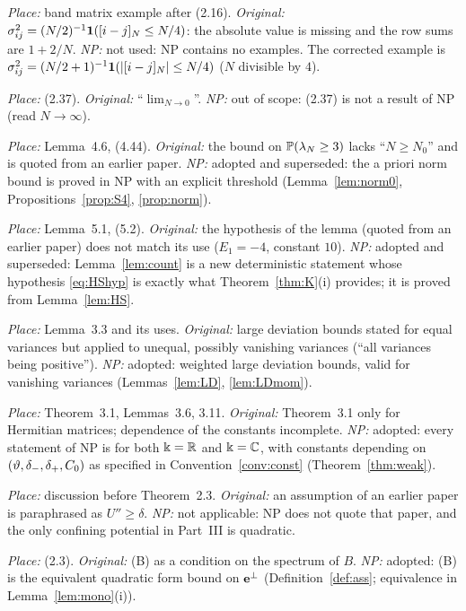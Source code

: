 \begin{description}[leftmargin=1.5em,itemsep=3pt,font=\normalfont\bfseries]
\item[PD-07] \emph{Place:} band matrix example after (2.16). \emph{Original:} $\sigma_{ij}^2=(N/2)^{-1}\mathbf{1}([i-j]_N\le N/4)$: the absolute value is missing and the row sums are $1+2/N$. \emph{NP:} not used: NP contains no examples. The corrected example is $\sigma_{ij}^2=(N/2+1)^{-1}\mathbf{1}(|[i-j]_N|\le N/4)$ ($N$ divisible by $4$).
\item[PD-08] \emph{Place:} (2.37). \emph{Original:} ``$\lim_{N\to0}$''. \emph{NP:} out of scope: (2.37) is not a result of NP (read $N\to\infty$).
\item[PD-09] \emph{Place:} Lemma~4.6, (4.44). \emph{Original:} the bound on $\mathbb{P}(\lambda_N\ge3)$ lacks ``$N\ge N_0$'' and is quoted from an earlier paper. \emph{NP:} adopted and superseded: the a priori norm bound is proved in NP with an explicit threshold (Lemma~\ref{lem:norm0}, Propositions~\ref{prop:S4}, \ref{prop:norm}).
\item[PD-10] \emph{Place:} Lemma~5.1, (5.2). \emph{Original:} the hypothesis of the lemma (quoted from an earlier paper) does not match its use ($E_1=-4$, constant $10$). \emph{NP:} adopted and superseded: Lemma~\ref{lem:count} is a new deterministic statement whose hypothesis \eqref{eq:HShyp} is exactly what Theorem~\ref{thm:K}(i) provides; it is proved from Lemma~\ref{lem:HS}.
\item[PD-11] \emph{Place:} Lemma~3.3 and its uses. \emph{Original:} large deviation bounds stated for equal variances but applied to unequal, possibly vanishing variances (``all variances being positive''). \emph{NP:} adopted: weighted large deviation bounds, valid for vanishing variances (Lemmas~\ref{lem:LD}, \ref{lem:LDmom}).
\item[PD-12] \emph{Place:} Theorem~3.1, Lemmas~3.6, 3.11. \emph{Original:} Theorem~3.1 only for Hermitian matrices; dependence of the constants incomplete. \emph{NP:} adopted: every statement of NP is for both $\Bbbk=\mathbb{R}$ and $\Bbbk=\mathbb{C}$, with constants depending on $(\vartheta,\delta_-,\delta_+,C_0)$ as specified in Convention~\ref{conv:const} (Theorem~\ref{thm:weak}).
\item[PD-13] \emph{Place:} discussion before Theorem~2.3. \emph{Original:} an assumption of an earlier paper is paraphrased as $U''\ge\delta$. \emph{NP:} not applicable: NP does not quote that paper, and the only confining potential in Part~III is quadratic.
\item[PD-14] \emph{Place:} (2.3). \emph{Original:} (B) as a condition on the spectrum of $B$. \emph{NP:} adopted: (B) is the equivalent quadratic form bound on $\mathbf{e}^\perp$ (Definition~\ref{def:ass}; equivalence in Lemma~\ref{lem:mono}(i)).

\end{description}

